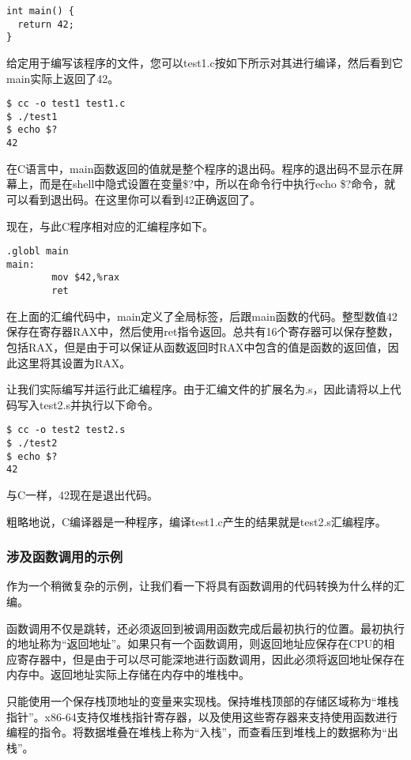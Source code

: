 \documentclass[cn,10pt,math=newtx,citestyle=gb7714-2015,bibstyle=gb7714-2015]{elegantbook}
\begin{document}
\begin{verbatim}
int main() {
  return 42;
}
\end{verbatim}

给定用于编写该程序的文件，您可以test1.c按如下所示对其进行编译，然后看到它main实际上返回了42。

\begin{verbatim}
$ cc -o test1 test1.c
$ ./test1
$ echo $?
42
\end{verbatim}

在C语言中，main函数返回的值就是整个程序的退出码。程序的退出码不显示在屏幕上，而是在shell中隐式设置在变量\$?中，所以在命令行中执行echo \$?命令，就可以看到退出码。在这里你可以看到42正确返回了。

现在，与此C程序相对应的汇编程序如下。

\begin{verbatim}
.globl main
main:
        mov $42,%rax
        ret
\end{verbatim}

在上面的汇编代码中，main定义了全局标签，后跟main函数的代码。整型数值42保存在寄存器RAX中，然后使用ret指令返回。总共有16个寄存器可以保存整数，包括RAX，但是由于可以保证从函数返回时RAX中包含的值是函数的返回值，因此这里将其设置为RAX。

让我们实际编写并运行此汇编程序。由于汇编文件的扩展名为.s，因此请将以上代码写入test2.s并执行以下命令。

\begin{verbatim}
$ cc -o test2 test2.s
$ ./test2
$ echo $?
42
\end{verbatim}

与C一样，42现在是退出代码。

粗略地说，C编译器是一种程序，编译test1.c产生的结果就是test2.s汇编程序。

\subsubsection{涉及函数调用的示例}

作为一个稍微复杂的示例，让我们看一下将具有函数调用的代码转换为什么样的汇编。

函数调用不仅是跳转，还必须返回到被调用函数完成后最初执行的位置。最初执行的地址称为“返回地址”。如果只有一个函数调用，则返回地址应保存在CPU的相应寄存器中，但是由于可以尽可能深地进行函数调用，因此必须将返回地址保存在内存中。返回地址实际上存储在内存中的堆栈中。

只能使用一个保存栈顶地址的变量来实现栈。保持堆栈顶部的存储区域称为“堆栈指针”。x86-64支持仅堆栈指针寄存器，以及使用这些寄存器来支持使用函数进行编程的指令。将数据堆叠在堆栈上称为“入栈”，而查看压到堆栈上的数据称为“出栈”。
\end{document}

